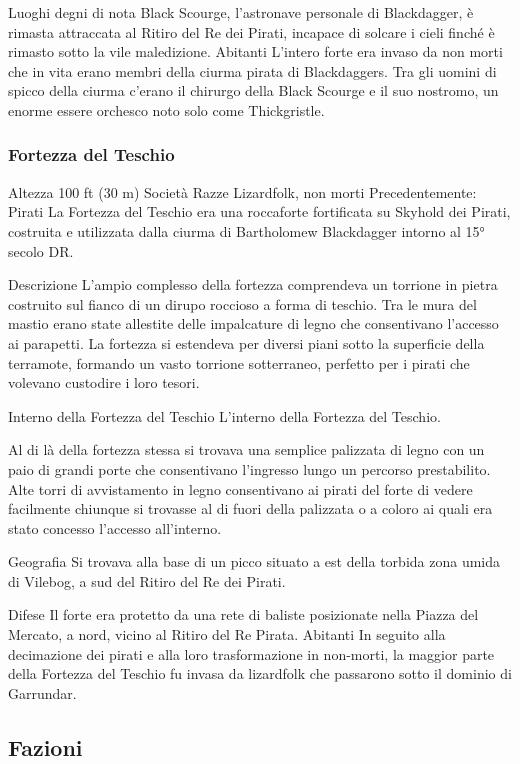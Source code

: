 \documentclass{article}
\begin{document}
Luoghi degni di nota
Black Scourge, l'astronave personale di Blackdagger, è rimasta attraccata al Ritiro del Re dei Pirati, incapace di solcare i cieli finché è rimasto sotto la vile maledizione.
Abitanti
L'intero forte era invaso da non morti che in vita erano membri della ciurma pirata di Blackdaggers. Tra gli uomini di spicco della ciurma c'erano il chirurgo della Black Scourge e il suo nostromo, un enorme essere orchesco noto solo come Thickgristle.
              \subsubsection{ Fortezza del Teschio}
Altezza
100 ft (30 m)
Società
Razze
Lizardfolk, non morti
Precedentemente: Pirati
La Fortezza del Teschio era una roccaforte fortificata su Skyhold dei Pirati, costruita e utilizzata dalla ciurma di Bartholomew Blackdagger intorno al 15° secolo DR.

Descrizione
L'ampio complesso della fortezza comprendeva un torrione in pietra costruito sul fianco di un dirupo roccioso a forma di teschio. Tra le mura del mastio erano state allestite delle impalcature di legno che consentivano l'accesso ai parapetti. La fortezza si estendeva per diversi piani sotto la superficie della terramote, formando un vasto torrione sotterraneo, perfetto per i pirati che volevano custodire i loro tesori.

Interno della Fortezza del Teschio
L'interno della Fortezza del Teschio.

Al di là della fortezza stessa si trovava una semplice palizzata di legno con un paio di grandi porte che consentivano l'ingresso lungo un percorso prestabilito. Alte torri di avvistamento in legno consentivano ai pirati del forte di vedere facilmente chiunque si trovasse al di fuori della palizzata o a coloro ai quali era stato concesso l'accesso all'interno.

Geografia
Si trovava alla base di un picco situato a est della torbida zona umida di Vilebog, a sud del Ritiro del Re dei Pirati.

Difese
Il forte era protetto da una rete di baliste posizionate nella Piazza del Mercato, a nord, vicino al Ritiro del Re Pirata.
Abitanti
In seguito alla decimazione dei pirati e alla loro trasformazione in non-morti, la maggior parte della Fortezza del Teschio fu invasa da lizardfolk che passarono sotto il dominio di Garrundar.
          \subsection{Fazioni}
\end{document}

